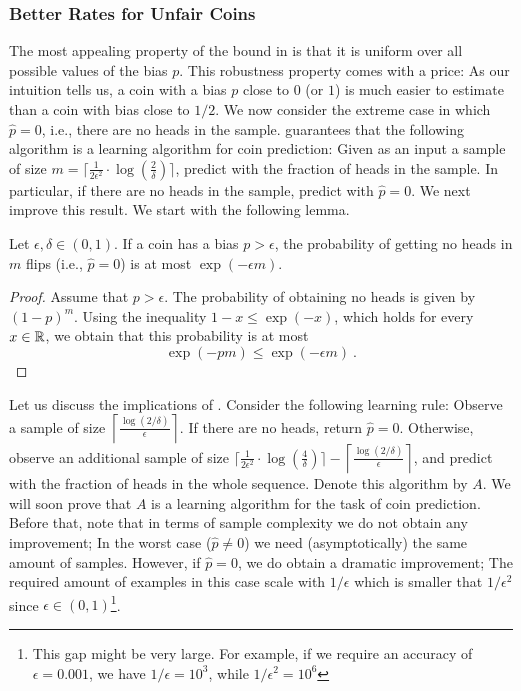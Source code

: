 \documentclass[11pt]{article}
\begin{document}
\subsubsection{Better Rates for Unfair Coins}
The most appealing property of the bound in  is that it is uniform over all possible values of the bias $p$. This robustness property comes with a
price: As our intuition tells us, a coin with a bias $p$ close to $0$
(or $1$) is much easier to estimate than a coin with bias close to
$1/2$. We now consider the extreme case
in which $\hat{p}=0$, i.e., there are no heads in the
sample.  guarantees that the following
algorithm is a learning algorithm for coin prediction: Given as
an input a sample of size $m=\lceil \frac{1}{2\epsilon^2} \cdot
  \log(\frac{2}{\delta}) \rceil$, predict with the fraction of heads in
the sample. In particular, if there are no heads in the sample, predict with $\hat{p}=0$. We next improve this result. We start with the following lemma.
\begin{lemma}  \label{lem:realizableCoin}
Let $\epsilon, \delta \in (0,1)$. If a coin has a bias $p>\epsilon$,
the probability of getting no heads in $m$ flips (i.e., $\hat{p}=0$)
is at most $\exp(-\epsilon m)$. 
\end{lemma}
\begin{proof} 
Assume that $p>\epsilon$. The probability of obtaining no heads is
given by $(1-p)^m$. Using the inequality $1-x \le \exp(-x)$, which
holds for every $x \in \mathbb{R}$, we obtain that this probability is at
most
\[
\exp(-pm) \le \exp(-\epsilon m)~.
\]
\end{proof}
Let us discuss the implications of
. Consider the following learning rule:
Observe a sample of size $\left \lceil \frac{\log(2/\delta)}{\epsilon}
\right \rceil$. If there are no heads, return $\hat{p}=0$. Otherwise, observe an 
additional sample of size $\lceil \frac{1}{2\epsilon^2} \cdot
  \log(\frac{4}{\delta}) \rceil - \left \lceil \frac{\log(2/\delta)}{\epsilon}
\right \rceil$, and predict with the fraction of heads in the whole
sequence. Denote this algorithm by $A$. We will soon prove that $A$ is a learning algorithm for the task of coin prediction. Before that, note that in terms of sample complexity we do not obtain any improvement; In the worst case ($\hat{p} \neq 0$) we need (asymptotically) the same amount of samples. However, if $\hat{p} = 0$, we do obtain a dramatic improvement; The required amount of examples in this case scale with $1/\epsilon$ which is smaller that $1/\epsilon^2$ since $\epsilon \in (0,1)$\footnote{This gap might be very large. For example, if we require an accuracy of $\epsilon=0.001$, we have $1/\epsilon=10^3$, while $1/\epsilon^2 = 10^6$}.
\end{document}
